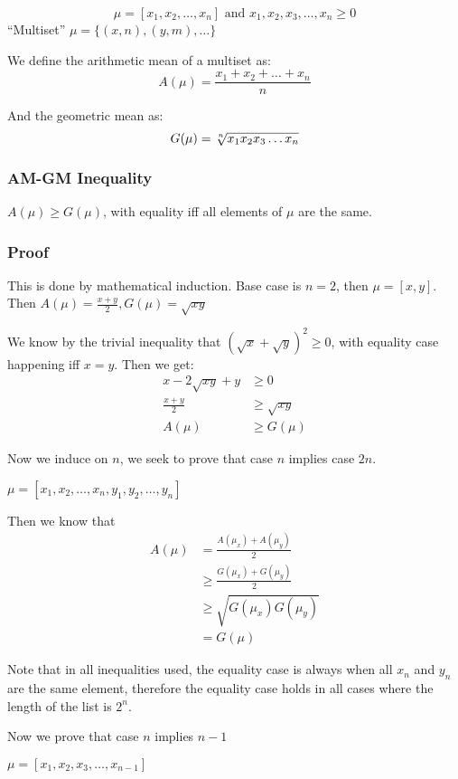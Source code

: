 $$\mu = [x_1, x_2, \dots, x_n] \text{ and } x_1, x_2, x_3, \dots, x_n \geq 0$$
``Multiset'' $\mu = \{(x, n), (y, m), \dots\}$

We define the arithmetic mean of a multiset as:
$$A(\mu) = \frac{x_1 + x_2 + \dots + x_n}{n}$$

And the geometric mean as:
$$G(\mu) = \sqrt[\uproot{2}n]{x_1x_2x_3\dots x_n}$$

\subsubsection{AM-GM Inequality}
$A(\mu) \geq G(\mu)$, with equality iff all elements
of $\mu$ are the same.

\subsubsection{Proof}
This is done by mathematical induction. Base case is $n = 2$, then $\mu = [x,
y]$. Then $A(\mu) = \frac{x + y}{2}, G(\mu) = \sqrt{xy}$

We know by the trivial inequality that $(\sqrt{x} + \sqrt{y})^2 \geq 0$, with
equality case happening iff $x = y$. Then we get:
\begin{align*}
    x - 2 \sqrt{xy} + y &\geq 0\\
        \frac{x + y}{2} &\geq \sqrt{xy}\\
                 A(\mu) &\geq G(\mu)
\end{align*}

Now we induce on $n$, we seek to prove that case $n$ implies case $2n$.

$\mu = [x_1, x_2, \dots, x_n, y_1, y_2, \dots, y_n]$

Then we know that
\begin{align*}
    A(\mu) &= \frac{A(\mu_x) + A(\mu_y)}{2}\\
           &\geq \frac{G(\mu_x) + G(\mu_y)}{2}\\
           &\geq \sqrt{G(\mu_x)G(\mu_y)}\\
           &= G(\mu)
\end{align*}

Note that in all inequalities used, the equality case is always when all $x_n$
and $y_n$ are the same element, therefore the equality case holds in all cases
where the length of the list is $2^n$.

Now we prove that case $n$ implies $n-1$

$\mu = [x_1, x_2, x_3, \dots, x_{n - 1}]$

